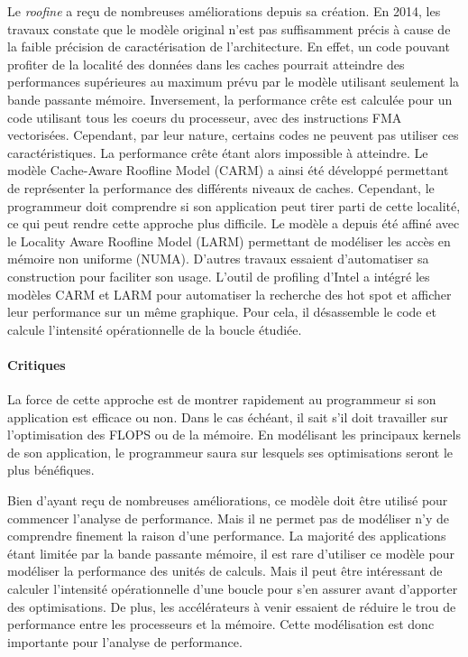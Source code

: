         
            Le \textit{roofine} a reçu de nombreuses améliorations depuis sa création. En 2014, les travaux \cite{Ilic2014} constate que le modèle original n’est pas suffisamment précis à cause de la faible précision de caractérisation de l’architecture. En effet, un code pouvant profiter de la localité des données dans les caches pourrait atteindre des performances supérieures au maximum prévu par le modèle utilisant seulement la bande passante mémoire. Inversement, la performance crête est calculée pour un code utilisant tous les coeurs du processeur, avec des instructions FMA vectorisées. Cependant, par leur nature, certains codes ne peuvent pas utiliser ces  caractéristiques. La performance crête étant alors impossible à atteindre. Le modèle Cache-Aware Roofline Model (CARM) \cite{Ilic2014} a ainsi été développé permettant de représenter la performance des différents niveaux de caches. Cependant, le programmeur doit comprendre si son application peut tirer parti de cette localité, ce qui peut rendre cette approche plus difficile. Le modèle a depuis été affiné avec le Locality Aware Roofline Model (LARM) \cite{Denoyelle2018} permettant de modéliser les accès en mémoire non uniforme (NUMA).
            D’autres travaux essaient d’automatiser sa construction \cite{lo2014roofline} pour faciliter son usage. L’outil de profiling d’Intel a intégré les modèles CARM et LARM pour automatiser la recherche des hot spot et afficher leur performance sur un même graphique. Pour cela, il désassemble le code et calcule l’intensité opérationnelle de la boucle étudiée.

        \paragraph{Critiques}

            
            La force de cette approche est de montrer rapidement au programmeur si son application est efficace ou non. Dans le cas échéant, il sait s’il doit travailler sur l’optimisation des FLOPS ou de la mémoire. En modélisant les principaux kernels de son application, le programmeur saura sur lesquels ses optimisations seront le plus bénéfiques.
            
            Bien d’ayant reçu de nombreuses améliorations, ce modèle doit être utilisé pour commencer l’analyse de performance. Mais il ne permet pas de modéliser n’y de comprendre finement la raison d’une performance.
            La majorité des applications étant limitée par la bande passante mémoire, il est rare d’utiliser ce modèle pour modéliser la performance des unités de calculs. Mais il peut être intéressant de calculer l’intensité opérationnelle d’une boucle pour s’en assurer avant d’apporter des optimisations. De plus, les accélérateurs à venir essaient de réduire le trou de performance entre les processeurs et la mémoire. Cette modélisation est donc importante pour l’analyse de performance.


